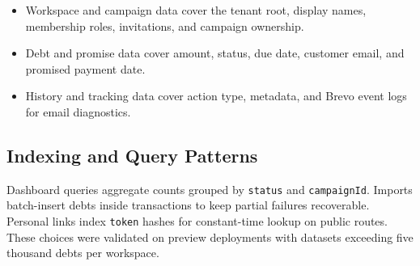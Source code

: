 ﻿\documentclass[12pt,a4paper]{report}
\begin{document}
\begin{itemize}
  \item Workspace and campaign data cover the tenant root, display names, membership roles, invitations, and campaign ownership.
  \item Debt and promise data cover amount, status, due date, customer email, and promised payment date.
  \item History and tracking data cover action type, metadata, and Brevo event logs for email diagnostics.
\end{itemize}

\subsection{Indexing and Query Patterns}

Dashboard queries aggregate counts grouped by \texttt{status} and \texttt{campaignId}.
Imports batch-insert debts inside transactions to keep partial failures recoverable.
Personal links index \texttt{token} hashes for constant-time lookup on public routes.
These choices were validated on preview deployments with datasets exceeding five thousand
debts per workspace.
\end{document}
